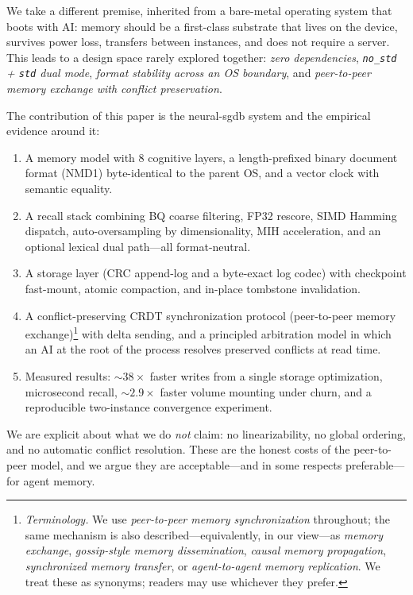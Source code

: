 \documentclass[11pt,twocolumn]{article}
\newcommand{\neural}{{\sf neural-sgdb}}
\begin{document}
We take a different premise, inherited from a bare-metal operating system that
boots with AI: memory should be a first-class substrate that lives on the
device, survives power loss, transfers between instances, and does not require
a server. This leads to a design space rarely explored together: \emph{zero
dependencies}, \emph{\texttt{no\_std} + \texttt{std} dual mode}, \emph{format
stability across an OS boundary}, and \emph{peer-to-peer memory exchange with
conflict preservation}.

The contribution of this paper is the \neural{} system and the empirical
evidence around it:
\begin{enumerate}
  \item A memory model with 8 cognitive layers, a length-prefixed binary
        document format (NMD1) byte-identical to the parent OS, and a vector
        clock with semantic equality.
  \item A recall stack combining BQ coarse filtering, FP32 rescore, SIMD
        Hamming dispatch, auto-oversampling by dimensionality, MIH
        acceleration, and an optional lexical dual path---all format-neutral.
  \item A storage layer (CRC append-log and a byte-exact log codec) with
        checkpoint fast-mount, atomic compaction, and in-place tombstone
        invalidation.
  \item A conflict-preserving CRDT synchronization protocol (peer-to-peer
        memory exchange)\footnote{\emph{Terminology.} We use
        \emph{peer-to-peer memory synchronization} throughout; the same
        mechanism is also described---equivalently, in our view---as
        \emph{memory exchange}, \emph{gossip-style memory dissemination},
        \emph{causal memory propagation}, \emph{synchronized memory transfer},
        or \emph{agent-to-agent memory replication}. We treat these as
        synonyms; readers may use whichever they prefer.}
        with delta sending, and a principled arbitration model in which an AI
        at the root of the process resolves preserved conflicts at read time.
  \item Measured results: $\sim 38\times$ faster writes from a single storage
        optimization, microsecond recall, $\sim 2.9\times$ faster volume
        mounting under churn, and a reproducible two-instance convergence
        experiment.
\end{enumerate}

We are explicit about what we do \emph{not} claim: no linearizability, no
global ordering, and no automatic conflict resolution. These are the honest
costs of the peer-to-peer model, and we argue they are acceptable---and in some
respects preferable---for agent memory.
\end{document}
